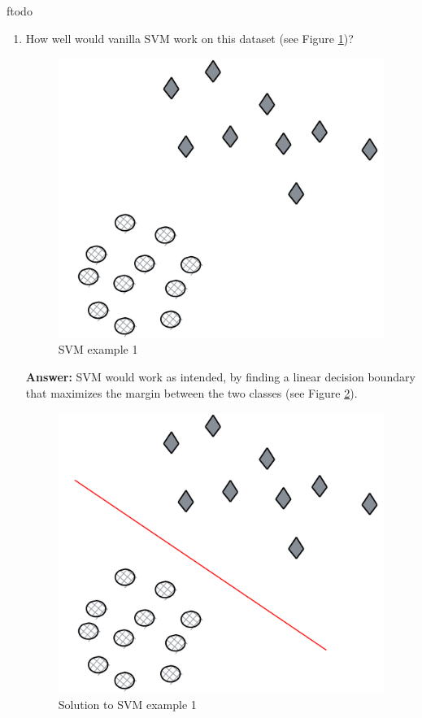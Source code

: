 ƒtodo\documentclass{article}
\newenvironment{QandA}{\begin{enumerate}[label=\arabic*.]}{\end{enumerate}}
\newenvironment{InnerQandA}{\begin{enumerate}[label=\roman*.]}{\end{enumerate}}
\newenvironment{answer}{\par\normalfont \textbf{Answer:}}{}
\begin{document}
\begin{QandA}
\begin{InnerQandA}
        \item How well would vanilla SVM work on this dataset (see Figure \ref{fig:svm-example-1})?
        \begin{figure}[htb!]
            \centering
            \includegraphics[width=0.3\columnwidth]{img/svm-example-1.png}
            \caption{SVM example 1}
            \label{fig:svm-example-1}
        \end{figure}
        \begin{answer}
            SVM would work as intended, by finding a linear decision boundary that maximizes the margin between the two classes (see Figure \ref{fig:-sol-svm-example-1}).
            \begin{figure}[htb!]
                \centering
                \includegraphics[width=0.3\columnwidth]{img/sol-svm-example-1.png}
                \caption{Solution to SVM example 1}
                \label{fig:-sol-svm-example-1}
            \end{figure}
        \end{answer}


\end{InnerQandA}
\end{QandA}
\end{document}
